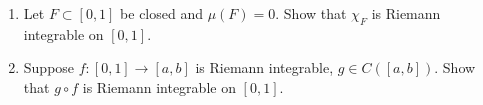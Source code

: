 \documentclass{article}
\begin{document}
\begin{enumerate}
\item 
Let $F \subset [0,1]$ be closed and $\mu(F) = 0$. Show that $\chi_{F}$ is Riemann integrable on $[0,1]$.







\item 
Suppose $f : [0,1] \to [a,b]$ is Riemann integrable, $g \in C([a,b])$. Show that $g\circ f$ is Riemann integrable on $[0,1]$.






\end{enumerate}
\end{document}
